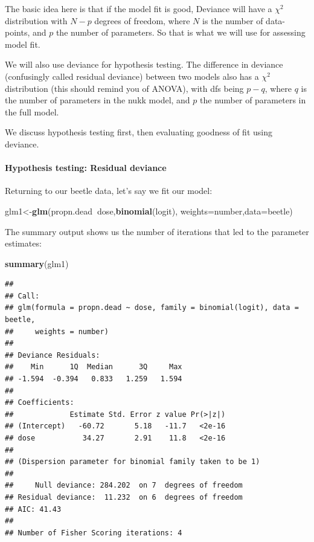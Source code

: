 \documentclass[12pt,]{krantz}
\newenvironment{Shaded}{\begin{snugshade}}{\end{snugshade}}
\newcommand{\DataTypeTok}[1]{\textcolor[rgb]{0.13,0.29,0.53}{#1}}
\newcommand{\KeywordTok}[1]{\textcolor[rgb]{0.13,0.29,0.53}{\textbf{#1}}}
\newcommand{\NormalTok}[1]{#1}
\newcommand{\OperatorTok}[1]{\textcolor[rgb]{0.81,0.36,0.00}{\textbf{#1}}}
\let\oldparagraph\paragraph
\renewcommand{\paragraph}[1]{\oldparagraph{#1}\mbox{}}
\begin{document}
The basic idea here is that if the model fit is good, Deviance will have a \(\chi^2\) distribution with \(N-p\) degrees of freedom, where \(N\) is the number of data-points, and \(p\) the number of parameters.
So that is what we will use for assessing model fit.

We will also use deviance for hypothesis testing.
The difference in deviance (confusingly called residual deviance) between two models also has a \(\chi^2\) distribution (this should remind you of ANOVA), with dfs being \(p-q\), where \(q\) is the number of parameters in the nukk model, and \(p\) the number of parameters in the full model.

We discuss hypothesis testing first, then evaluating goodness of fit using deviance.

\hypertarget{hypothesis-testing-residual-deviance}{%
\paragraph{Hypothesis testing: Residual deviance}\label{hypothesis-testing-residual-deviance}}

Returning to our beetle data, let's say we fit our model:

\begin{Shaded}
\begin{Highlighting}[]
\NormalTok{glm1<-}\KeywordTok{glm}\NormalTok{(propn.dead}\OperatorTok{~}\NormalTok{dose,}\KeywordTok{binomial}\NormalTok{(logit),}
          \DataTypeTok{weights=}\NormalTok{number,}\DataTypeTok{data=}\NormalTok{beetle)}
\end{Highlighting}
\end{Shaded}

The summary output shows us the number of iterations that led to the parameter estimates:

\begin{Shaded}
\begin{Highlighting}[]
\KeywordTok{summary}\NormalTok{(glm1)}
\end{Highlighting}
\end{Shaded}

\begin{verbatim}
## 
## Call:
## glm(formula = propn.dead ~ dose, family = binomial(logit), data = beetle, 
##     weights = number)
## 
## Deviance Residuals: 
##    Min      1Q  Median      3Q     Max  
## -1.594  -0.394   0.833   1.259   1.594  
## 
## Coefficients:
##             Estimate Std. Error z value Pr(>|z|)
## (Intercept)   -60.72       5.18   -11.7   <2e-16
## dose           34.27       2.91    11.8   <2e-16
## 
## (Dispersion parameter for binomial family taken to be 1)
## 
##     Null deviance: 284.202  on 7  degrees of freedom
## Residual deviance:  11.232  on 6  degrees of freedom
## AIC: 41.43
## 
## Number of Fisher Scoring iterations: 4
\end{verbatim}
\end{document}
